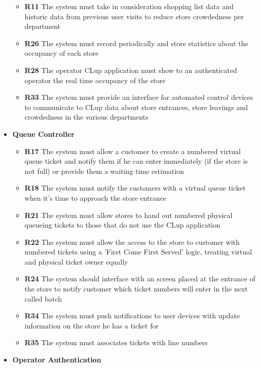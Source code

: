 \begin{itemize}
\begin{itemize}
              \item \textbf{R11} The system must take in consideration shopping list data and historic data from previous user visits to reduce store crowdedness per department
              \item \textbf{R26} The system must record periodically and store statistics about the occupancy of each store
              \item \textbf{R28} The operator CLup application must show to an authenticated operator the real time occupancy of the store
              \item \textbf{R33} The system must provide an interface for automated control devices to communicate to CLup data about store entrances, store leavings and crowdedness in the various departments
          \end{itemize}
    \item \colorbox{clup_yellow}{\textbf{Queue Controller}}
          \begin{itemize}
              \item \textbf{R17} The system must allow a customer to create a numbered virtual queue ticket and notify them if he can enter immediately (if the store is not full) or provide them a waiting time estimation
              \item \textbf{R18} The system must notify the customers with a virtual queue ticket when it’s time to approach the store entrance
              \item \textbf{R21} The system must allow stores to hand out numbered physical queueing tickets to those that do not use the CLup application
              \item \textbf{R22} The system must allow the access to the store to customer with numbered tickets using a ’First Come First Served’ logic, treating virtual and physical ticket owner equally
              \item \textbf{R24} The system should interface with an screen placed at the entrance of the store to notify customer which ticket numbers will enter in the next called batch
              \item \textbf{R34} The system must push notifications to user devices with update information on the store he has a ticket for
              \item \textbf{R35} The system must associates tickets with line numbers
          \end{itemize}
    \item \colorbox{clup_yellow}{\textbf{Operator Authentication}}

\end{itemize}

